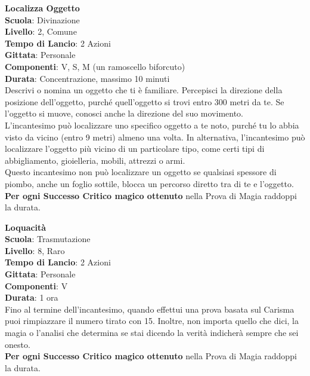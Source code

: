 \begin{multicols}{2}
\medskip\textbf{Localizza Oggetto}\\
\textbf{Scuola}: Divinazione\\
\textbf{Livello}: 2, Comune\\
\textbf{Tempo di Lancio}: 2 Azioni\\
\textbf{Gittata}: Personale\\
\textbf{Componenti}: V, S, M (un ramoscello biforcuto)\\
\textbf{Durata}: Concentrazione, massimo 10 minuti \\
Descrivi o nomina un oggetto che ti è familiare. Percepisci la direzione della posizione dell'oggetto, purché quell'oggetto si trovi entro 300 metri da te. Se l'oggetto si muove, conosci anche la direzione del suo movimento.\\
L'incantesimo può localizzare uno specifico oggetto a te noto, purché tu lo abbia visto da vicino (entro 9 metri) almeno una volta. In alternativa, l'incantesimo può localizzare l'oggetto più vicino di un particolare tipo, come certi tipi di abbigliamento, gioielleria, mobili, attrezzi o armi.\\
Questo incantesimo non può localizzare un oggetto se qualsiasi spessore di piombo, anche un foglio sottile, blocca un percorso diretto tra di te e l'oggetto.\\
\textbf{Per ogni Successo Critico magico ottenuto} nella Prova di Magia raddoppi la durata.

\medskip\textbf{Loquacità}\\
\textbf{Scuola}: Trasmutazione\\
\textbf{Livello}: 8, Raro\\
\textbf{Tempo di Lancio}: 2 Azioni\\
\textbf{Gittata}: Personale\\
\textbf{Componenti}: V\\
\textbf{Durata}: 1 ora\\
Fino al termine dell'incantesimo, quando effettui una prova basata sul Carisma puoi rimpiazzare il numero tirato con 15. Inoltre, non importa quello che dici, la magia o l'analisi che determina se stai dicendo la verità indicherà sempre che sei onesto.\\
\textbf{Per ogni Successo Critico magico ottenuto} nella Prova di Magia raddoppi la durata.


\end{multicols}
